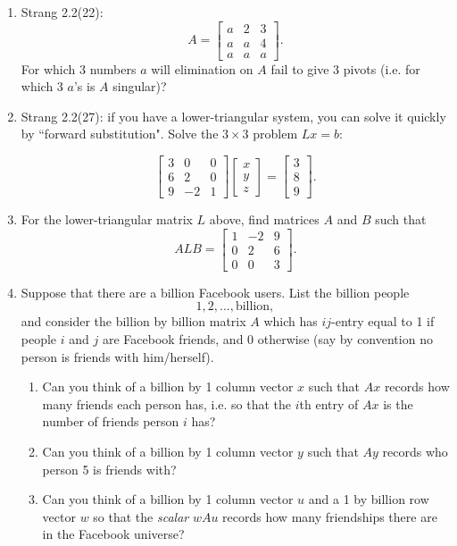 \documentclass[11pt]{article}
\begin{document}
\begin{enumerate}

\item Strang 2.2(22): 
\[A = \begin{bmatrix} a & 2 & 3 \\ a& a & 4 \\ a & a & a \end{bmatrix}. \]
For which 3 numbers $a$ will elimination on $A$ fail to give 3 pivots (i.e. for which 3 $a$'s is $A$ singular)?

\item Strang 2.2(27): if you have a lower-triangular system, you can solve it quickly by ``forward substitution".  Solve the $3\times 3$ problem $Lx=b$:

\[\begin{bmatrix} 3 & 0 & 0 \\ 6 & 2 & 0 \\ 9 & -2 & 1 \end{bmatrix} \begin{bmatrix} x \\ y \\ z \end{bmatrix} = \begin{bmatrix} 3 \\ 8 \\ 9 \end{bmatrix}.\]



\item For the lower-triangular matrix $L$ above, find matrices $A$ and $B$ such that
\[A L B = \begin{bmatrix} 1 & -2 & 9 \\ 0 & 2 & 6 \\ 0 & 0 & 3 \end{bmatrix}. \]





\item Suppose that there are a billion Facebook users.  List the billion people 
\[1, 2, ..., \text{billion},\] 
and consider the billion by billion matrix $A$ which has $ij$-entry equal to 1 if people $i$ and $j$ are Facebook friends, and 0 otherwise (say by convention no person is friends with him/herself).  
\begin{enumerate}
\item Can you think of a billion by 1 column vector $x$ such that $Ax$ records how many friends each person has, i.e. so that the $i$th entry of $Ax$ is the number of friends person $i$ has?  
\item Can you think of a billion by 1 column vector $y$ such that $Ay$ records who person 5 is friends with?  
\item Can you think of a billion by 1 column vector $u$ and a 1 by billion row vector $w$ so that the \textit{scalar} $wAu$ records how many friendships there are in the Facebook universe? 
\end{enumerate}


\end{enumerate}
\end{document}
